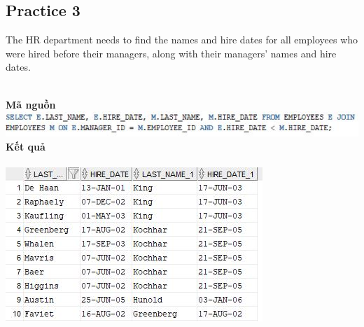 \documentclass[12pt,a4paper]{report}
\begin{document}
\subsection{Practice 3}
\begin{boxedminipage}[t]{15.5cm}
	The HR department needs to find the names and hire dates for all employees 
	who were hired before their managers, along with their managers’ names and hire dates.
\end{boxedminipage}
\newline
\\
\textbf{Mã nguồn}
\\
\newline
\includegraphics[scale=1]{36.jpg}\\
\textbf{Kết quả}\\\\
\includegraphics[scale=1]{k36.jpg}
\end{document}
